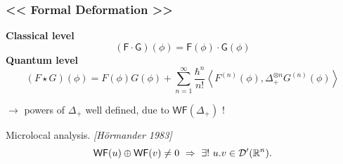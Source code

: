 \documentclass[9pt]{beamer}
\newcommand{\Smearip}[1]{\left\langle #1 \right\rangle} %
\newcommand{\WF}{\mathsf{WF}} %
\newcommand{\citebeam}[1]{\textit{\textcolor{black!60!white}{[#1]}}} %
\newcommand{\Fsf}{\mathsf{F}}
\newcommand{\Gsf}{\mathsf{G}}
\begin{document}

\begin{frame}

\frametitle{<< Formal Deformation >>}


\vfill

%
\textbf{Classical level}
\begin{equation*}
(\Fsf \cdot \Gsf)(\phi) = \Fsf(\phi) \cdot \Gsf(\phi) 
\end{equation*}
%
\textbf{Quantum level}
%
\begin{equation*}
(F \star G)(\phi) = F(\phi) G(\phi) + \sum_{n=1}^\infty \frac{\hbar^n}{n!} \Smearip{F^{(n)}(\phi), \Delta_+^{\otimes n} G^{(n)}(\phi)} 
\end{equation*}
%

\vfill

$\to$ powers of $\Delta_+$ well defined, due to $\mathsf{WF}(\Delta_+)$ !

\vfill

\begin{block}{Microlocal analysis. \citebeam{Hörmander 1983}}
\vspace*{-20pt}
\begin{equation*}
\WF(u) \oplus \WF(v) \neq 0 \ \Rightarrow \ \exists! \ u.v \in \mathcal{D}^{\prime}(\mathbb{R}^n). 
\vspace*{-6pt}
\end{equation*}
\end{block}

\vfill

\end{frame} 

\end{document}
